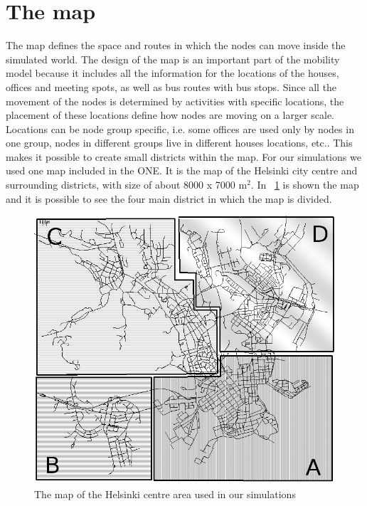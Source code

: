 \section{The map}
\label{mappaONE}
The map defines the space and routes in which the nodes can move inside the simulated world. The design of the map is an important part of the mobility model because it includes all the information for the locations of the houses, offices and meeting spots, as well as bus routes with bus stops. Since all the movement of the nodes is determined by activities with specific locations, the placement of these locations define how nodes are moving on a larger scale. Locations can be node group specific, i.e. some offices are used only by nodes in one group, nodes in different groups live in different houses locations, etc.. This makes it possible to create small districts within the map. For our simulations we used one map included in the ONE. It is the map of the Helsinki city centre and surrounding districts, with size of about 8000 x 7000 m$^{2}$. In \figurename~\ref{imgMappaABCD} is shown the map and it is possible to see the four main district in which the map is divided. 

\begin{figure}[htpb]
  \begin{center}
    \includegraphics[scale=0.5]{figure/mappa_ABCD.png}
    \caption[Helsinky map]{The map of the Helsinki centre area used in our simulations}    
    \label{imgMappaABCD}
  \end{center}
\end{figure}


